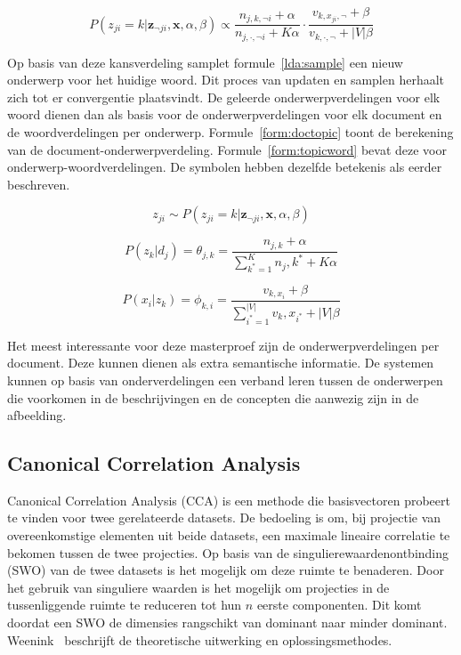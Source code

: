 \begin{equation}
    P(z_{ji} = k | \mathbf{z}_{\neg ji}, \mathbf{x}, \alpha, \beta) \propto \frac{n_{j,k,\neg i} + \alpha}{n_{j, \cdot, \neg i} + K \alpha} \cdot \frac{v_{k,x_{ji}, \neg}+ \beta}{v_{k,\cdot,\neg} + |V|\beta}
    \label{lda:update}
\end{equation}

Op basis van deze kansverdeling samplet formule~\eqref{lda:sample} een nieuw onderwerp voor het huidige woord. Dit proces van updaten en samplen herhaalt zich tot er convergentie plaatsvindt. De geleerde onderwerpverdelingen voor elk woord dienen dan als basis voor de onderwerpverdelingen voor elk document en de woordverdelingen per onderwerp. Formule~\eqref{form:doctopic} toont de berekening van de document-onderwerpverdeling. Formule~\eqref{form:topicword} bevat deze voor onderwerp-woordverdelingen. De symbolen hebben dezelfde betekenis als eerder beschreven.

\begin{equation}
    z_{ji} \sim  P(z_{ji} = k | \mathbf{z}_{\neg ji}, \mathbf{x}, \alpha, \beta)
    \label{lda:sample}
\end{equation}

\begin{equation}
    P(z_k|d_j) = \theta_{j,k} = \frac{n_{j,k} + \alpha}{\sum_{k^*=1}^K n_j,k^* + K\alpha}
    \label{form:doctopic}
\end{equation}

\begin{equation}
    P(x_i|z_k) = \phi_{k,i} = \frac{v_{k,x_i} + \beta}{\sum_{i^*=1}^{|V|} v_k,x_{i^*} + |V|\beta}
    \label{form:topicword}
\end{equation}

Het meest interessante voor deze masterproef zijn de onderwerpverdelingen per document. Deze kunnen dienen als extra semantische informatie. De systemen kunnen op basis van onderverdelingen een verband leren tussen de onderwerpen die voorkomen in de beschrijvingen en de concepten die aanwezig zijn in de afbeelding. 


\subsection{Canonical Correlation Analysis}
       
Canonical Correlation Analysis (CCA) is een methode die basisvectoren probeert te vinden voor twee gerelateerde datasets. De bedoeling is om, bij projectie van overeenkomstige elementen uit beide datasets, een maximale lineaire correlatie te bekomen tussen de twee projecties. 
Op basis van de singulierewaardenontbinding (SWO) van de twee datasets is het mogelijk om deze ruimte te benaderen. Door het gebruik van singuliere waarden is het mogelijk om projecties in de tussenliggende ruimte te reduceren tot hun $n$ eerste componenten. Dit komt doordat een SWO de dimensies rangschikt van dominant naar minder dominant. Weenink~\cite{Weenink2003} beschrijft de theoretische uitwerking en oplossingsmethodes.

